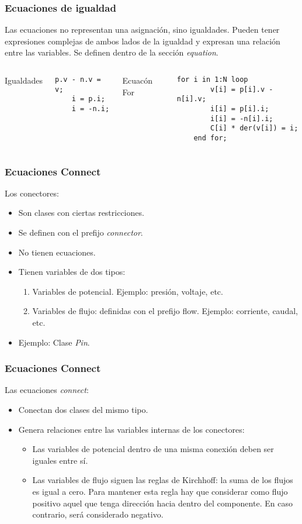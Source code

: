 \documentclass[aspectratio=169,10pt]{beamer}
\begin{document}
\begin{frame}[fragile]
\frametitle{Ecuaciones de igualdad} 

Las ecuaciones no representan una asignaci\'on, sino igualdades. Pueden tener expresiones complejas de ambos lados de la igualdad y expresan una relaci\'on entre las variables. Se definen dentro de la secci\'on \textit{equation}.

\begin{columns}  
\column[t]{8cm}
Igualdades
\begin{lstlisting}[style=base]
    p.v - n.v = v;
    i = p.i;
    i = -n.i;
\end{lstlisting} 
\column[t]{5cm}
Ecuac\'on For
\begin{lstlisting}[style=base]
    for i in 1:N loop
        v[i] = p[i].v - n[i].v;
        i[i] = p[i].i;
        i[i] = -n[i].i;
        C[i] * der(v[i]) = i;
    end for;
\end{lstlisting} 
\end{columns}


\end{frame}

\begin{frame}[fragile]
\frametitle{Ecuaciones Connect} 
Los conectores:
\begin{itemize}
\item Son clases con ciertas restricciones.
\item Se definen con el prefijo \textit{connector}.
\item No tienen ecuaciones.
\item Tienen variables de dos tipos:
	\begin{enumerate}
		\item Variables de potencial. Ejemplo: presi\'on, voltaje, etc. 
		\item Variables de flujo: definidas con el prefijo flow. Ejemplo: corriente, caudal, etc.
	\end{enumerate}
\item Ejemplo: Clase \textit{Pin}.
\end{itemize}

\end{frame}

\begin{frame}[fragile]
\frametitle{Ecuaciones Connect} 
Las ecuaciones \textit{connect}: 
\begin{itemize}
\item Conectan dos clases del mismo tipo.
\item Genera relaciones entre las variables internas de los conectores:
\begin{itemize}
\item Las variables de potencial dentro de una misma conexi\'on deben ser iguales entre s\'i.
\item Las variables de flujo siguen las reglas de Kirchhoff: la suma de los flujos es igual a cero. Para mantener esta regla hay que considerar como flujo positivo aquel que tenga direcci\'on hacia dentro del componente. En caso contrario, ser\'a considerado negativo. 
\end{itemize}
\end{itemize}
\end{frame}
\end{document}
